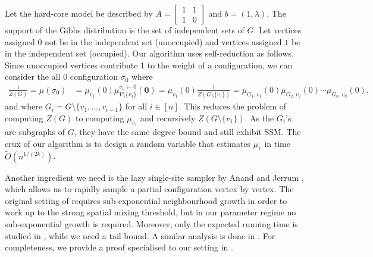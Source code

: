 \documentclass{theoretics}
\begin{document}
Let the hard-core model be described by $A=\begin{bmatrix}1&1\\1&0\end{bmatrix}$ and $b=(1,\lambda)$.
The support of the Gibbs distribution is the set of independent sets of $G$. 
Let vertices assigned $0$ not be in the independent set (unoccupied) and vertices assigned $1$ be in the independent set (occupied). 
Our algorithm uses self-reduction \cite{JVV86} as follows.
Since unoccupied vertices contribute $1$ to the weight of a configuration, we can consider the all $0$ configuration $\sigma_0$ where 
\begin{align}
\label{hardcore-reduction}
\frac{1}{Z(G)}=\mu(\sigma_0)&=\mu_{v_1}(0)\mu_{V\setminus\{v_1\}}^{v_1\leftarrow0}(\mathbf{0})
=\mu_{v_1}(0)\frac{1}{Z(G\setminus\{v_1\})}
=\mu_{G_1,v_1}(0)\mu_{G_2,v_2}(0)\cdots\mu_{G_n,v_n}(0),
\end{align}
and where $G_i=G\setminus\{v_1,\ldots,v_{i-1}\}$ for all $i\in[n]$.
This reduces the problem of computing $Z(G)$ to computing $\mu_{v_1}$ and recursively $Z(G\setminus\{v_1\})$.
As the $G_i$'s are subgraphs of $G$, they have the same degree bound and still exhibit SSM.
The crux of our algorithm is to design a random variable that estimates $\mu_{v}$ in time $\widetilde{O}(n^{1/(2k)})$.



Another ingredient we need is the lazy single-site sampler by Anand and Jerrum \cite{AJ22},
which allows us to rapidly sample a partial configuration vertex by vertex. 
The original setting of \cite{AJ22} requires sub-exponential neighbourhood growth in order to work up to the strong spatial mixing threshold, but in our parameter regime no sub-exponential growth is required. 
Moreover, only the expected running time is studied in \cite{AJ22}, while we need a tail bound. 
A similar analysis is done in \cite[Appendix B]{FGWWY22}. 
For completeness, we provide a proof specialised to our setting in .
\end{document}
